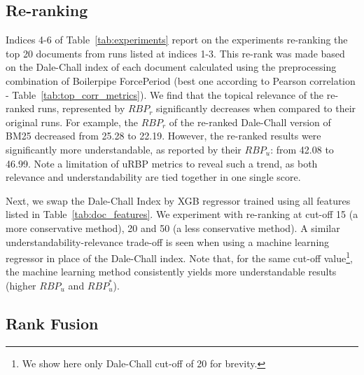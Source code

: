 
\subsection{Re-ranking}
\label{results:reranking}

Indices 4-6 of Table~\ref{tab:experiments} report on the experiments re-ranking the top 20 documents from runs listed at indices 1-3. This re-rank was made based on the Dale-Chall index of each document calculated using the preprocessing combination of Boilerpipe ForcePeriod (best one according to Pearson correlation - Table~\ref{tab:top_corr_metrics}).
We find that the topical relevance of the re-ranked runs, represented by $RBP_r$ significantly decreases when compared to their original runs. For example, the $RBP_r$ of the re-ranked Dale-Chall version of BM25 decreased from 25.28 to 22.19. However, the re-ranked results were significantly more understandable, as reported by their $RBP_u$: from 42.08 to 46.99. 
Note a limitation of uRBP metrics to reveal such a trend, as both relevance and understandability are tied together in one single score.

Next, we swap the Dale-Chall Index by XGB regressor trained using all features listed in Table~\ref{tab:doc_features}. %
We experiment with re-ranking at cut-off 15 (a more conservative method), 20 and 50 (a less conservative method). 
A similar understandability-relevance trade-off is seen when using a machine learning regressor in place of the Dale-Chall index.
Note that, for the same cut-off value\footnote{We show here only Dale-Chall cut-off of 20 for brevity.}, the machine learning method consistently yields more understandable results (higher $RBP_u$ and $RBP_u^*$). 

\subsection{Rank Fusion}
\label{results:fusion}

